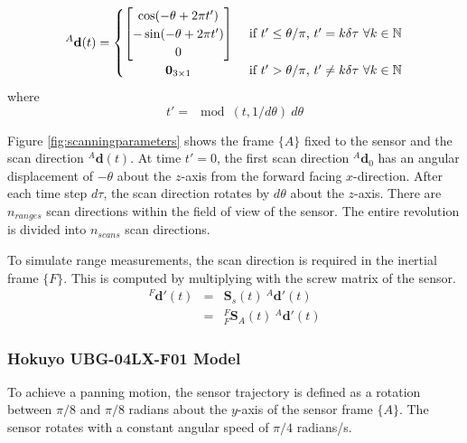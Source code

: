 \begin{equation}
^{A}\mathbf{d}(t) =
	\begin{cases} 
	      \hfill \begin{bmatrix}
	      		\cos(-\theta + 2\pi t') \\
	      		-\sin(-\theta + 2\pi t') \\
	      		0
	      	\end{bmatrix}    \hfill & \text{ if $t' \leq \theta/\pi$, $t' = k\delta\tau$  $\forall k \in \mathbb{N}$} \\
	      \hfill \mathbf{0}_{3 \times 1} \hfill & \text{ if $t' > \theta/\pi$, $t' \neq k\delta\tau$  $\forall k \in \mathbb{N}$} \\
	\end{cases} 
\end{equation}
where
\begin{equation}
t' = \mod(t,1/d\theta)\:d\theta
\end{equation}

Figure \ref{fig:scanningparameters} shows the frame $\{A\}$ fixed to the sensor and the scan direction ${^{A}\mathbf{d}(t)}$. At time $t' = 0$, the first scan direction ${^{A}\mathbf{d}_0}$ has an angular displacement of $-\theta$ about the $z$-axis from the forward facing $x$-direction. After each time step $d\tau$, the scan direction rotates by $d\theta$ about the $z$-axis. There are $n_{ranges}$ scan directions within the field of view of the sensor. The entire revolution is divided into $n_{scans}$ scan directions.


To simulate range measurements, the scan direction is required in the inertial frame $\{F\}$. This is computed by multiplying with the screw matrix of the sensor.
\begin{equation}
	\begin{array}{lcl}
	{^{F}\mathbf{d'}(t)} & = & \mathbf{S}_s(t)\:{^{A}\mathbf{d'}(t)} \\
	& = & {^{F}_{F}\mathbf{S}^{}_{A}(t)}\:{^{A}\mathbf{d'}(t)}
	\end{array}
\end{equation}

\subsubsection{Hokuyo UBG-04LX-F01 Model} 
To achieve a panning motion, the sensor trajectory is defined as a rotation between $\pi/8$ and $\pi/8$ radians about the $y$-axis of the sensor frame $\{A\}$. The sensor rotates with a constant angular speed of $\pi/4$ radians/s.


